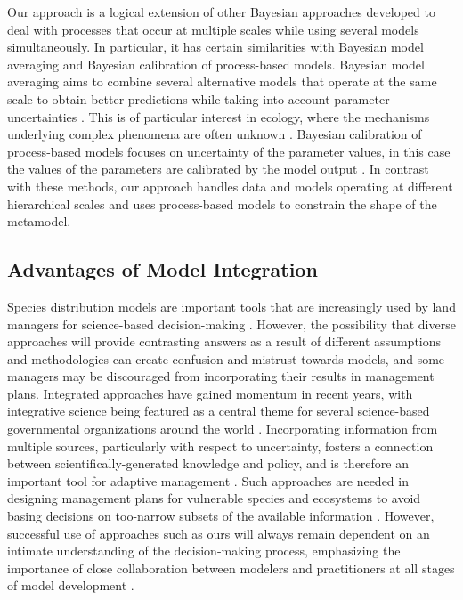 \documentclass[11pt]{article}
\begin{document}
Our approach is a logical extension of other Bayesian approaches developed to deal with processes that occur at multiple scales while using several models simultaneously. 
In particular, it has certain similarities with Bayesian model averaging and Bayesian calibration of process-based models. 
Bayesian model averaging aims to combine several alternative models that operate at the same scale to obtain better predictions while taking into account parameter uncertainties \citep{Hoeting1999}. This is of particular interest in ecology, where the mechanisms underlying complex phenomena are often unknown \citep[e.g.,][]{Link2006}. 
Bayesian calibration of process-based models focuses on uncertainty of the parameter values, in this case the values of the parameters are calibrated by the model output \citep{VanOijen2005, Hartig2012}. 
In contrast with these methods, our approach handles data and models operating at different hierarchical scales and uses process-based models to constrain the shape of the metamodel.



\subsection*{Advantages of Model Integration}
Species distribution models are important tools that are increasingly used by land managers for science-based decision-making \citep{Guisan2013}.
However, the possibility that diverse approaches will provide contrasting answers as a result of different assumptions and methodologies can create confusion and mistrust towards models, and some managers may be discouraged from incorporating their results in management plans. 
Integrated approaches have gained momentum in recent years, with integrative science being featured as a central theme for several science-based governmental organizations around the world \citep[e.g.,][]{Bernier2013}. 
Incorporating information from multiple sources, particularly with respect to uncertainty, fosters a connection between scientifically-generated knowledge and policy, and is therefore an important tool for adaptive management \citep[][Fig. \ref{fig:management}]{Rehme2011}.
Such approaches are needed in designing management plans for vulnerable species and ecosystems to avoid basing decisions on too-narrow subsets of the available information \citep{Dawson2011}.
However, successful use of approaches such as ours will always remain dependent on an intimate understanding of the decision-making process, emphasizing the importance of close collaboration between modelers and practitioners at all stages of model development \citep{Guisan2013}.
\end{document}

